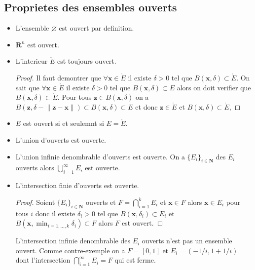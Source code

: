 \subsection{Proprietes des ensembles ouverts}

\begin{itemize}
\item L'ensemble $\varnothing$ est ouvert par definition.
\item $\mathbf{R}^{n}$ est ouvert.
\item L'interieur $\mathring{E}$ est toujours ouvert.
\begin{proof}
Il faut demontrer que $\forall \boldsymbol{x}\in\mathring{E}$ il existe $\delta>0$ tel que $B(\boldsymbol{x},\delta)\subset\mathring{E}$. On sait que $\forall \boldsymbol{x}\in\mathring{E}$ il existe $\delta>0$ tel que $B(\boldsymbol{x},\delta)\subset E$ alors on doit verifier que $B(\boldsymbol{x},\delta)\subset\mathring{E}$. Pour tous $\boldsymbol{z}\in B(\boldsymbol{x},\delta)$ on a $B(\boldsymbol{z},\delta-\lVert \boldsymbol{z}-\boldsymbol{x} \rVert)\subset B(\boldsymbol{x},\delta)\subset E$ et donc $\boldsymbol{z}\in\mathring{E}$ et $B(\boldsymbol{x},\delta)\subset\mathring{E}$,
\end{proof}
\item $E$ est ouvert si et seulemnt si $E=\mathring{E}$.
\item L'union d'ouverts est ouverte.
\item L'union infinie denombrable d'ouverts est ouverte. On a $\{ E_{i} \}_{i\in \mathbf{N}}$ des $E_{i}$ ouverts alors $\bigcup _{i=1}^{\infty}E_{i}$ est ouverte.
\item L'intersection finie d'ouverts est ouverte.
\begin{proof}
Soient $\{ E_{i} \}_{i\in \mathbf{N}}$ ouverts et $F=\bigcap _{i=1}^{k}E_{i}$ et $\boldsymbol{x }\in F$ alors $\boldsymbol{x}\in E_{i}$ pour tous $i$ donc il existe $\delta _{i}>0$ tel que $B(\boldsymbol{x},\delta _{i})\subset E_{i}$ et $B(\boldsymbol{x},\min_{i=1,\dots,k} \delta_{i})\subset F$ alors $F$ est ouvert.
\end{proof}
\begin{remark}
L'intersection infinie denombrable des $E_{i}$ ouverts n'est pas un ensemble ouvert. Comme contre-exemple on a $F=[0,1]$ et $E_{i}=(-1/i,1+1/i)$ dont l'intersection $\bigcap _{i=1}^{\infty}E_{i}=F$ qui est ferme.
\end{remark}
\end{itemize}

